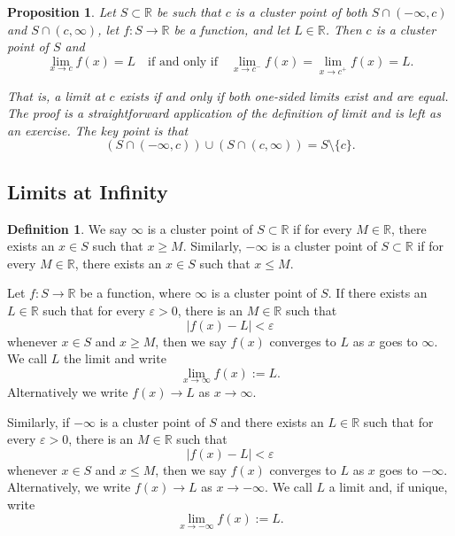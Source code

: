 \documentclass{article}
\newtheorem{prop}[theorem]{Proposition}
\theoremstyle{definition}
\newtheorem{defi}{Definition}[section]
\begin{document}
\begin{prop}
    Let \( S \subset \mathbb{R} \) be such that \( c \) is a cluster point of both \( S \cap (-\infty, c) \) and \( S \cap (c, \infty) \), let \( f: S \rightarrow \mathbb{R} \) be a function, and let \( L \in \mathbb{R} \). Then \( c \) is a cluster point of \( S \) and
    \[ \lim_{x \to c} f(x) = L \quad \text{if and only if} \quad \lim_{x \to c^-} f(x) = \lim_{x \to c^+} f(x) = L. \]
    
    That is, a limit at \( c \) exists if and only if both one-sided limits exist and are equal. The proof is a straightforward application of the definition of limit and is left as an exercise. The key point is that
    \[ (S \cap (-\infty, c)) \cup (S \cap (c, \infty)) = S \setminus \{c\}. \]    
\end{prop}


\subsection{Limits at Infinity}
\begin{defi}
    We say \( \infty \) is a cluster point of \( S \subset \mathbb{R} \) if for every \( M \in \mathbb{R} \), there exists an \( x \in S \) such that \( x \geq M \). Similarly, \( -\infty \) is a cluster point of \( S \subset \mathbb{R} \) if for every \( M \in \mathbb{R} \), there exists an \( x \in S \) such that \( x \leq M \).

Let \( f: S \rightarrow \mathbb{R} \) be a function, where \( \infty \) is a cluster point of \( S \). If there exists an \( L \in \mathbb{R} \) such that for every \( \varepsilon > 0 \), there is an \( M \in \mathbb{R} \) such that
\[
|f(x) - L| < \varepsilon
\]
whenever \( x \in S \) and \( x \geq M \), then we say \( f(x) \) converges to \( L \) as \( x \) goes to \( \infty \). We call \( L \) the limit and write
\[
\lim_{x \rightarrow \infty} f(x) := L.
\]
Alternatively we write \( f(x) \rightarrow L \) as \( x \rightarrow \infty \).

Similarly, if \( -\infty \) is a cluster point of \( S \) and there exists an \( L \in \mathbb{R} \) such that for every \( \varepsilon > 0 \), there is an \( M \in \mathbb{R} \) such that
\[
|f(x) - L| < \varepsilon
\]
whenever \( x \in S \) and \( x \leq M \), then we say \( f(x) \) converges to \( L \) as \( x \) goes to \( -\infty \). Alternatively, we write \( f(x) \rightarrow L \) as \( x \rightarrow -\infty \). We call \( L \) a limit and, if unique, write
\[
\lim_{x \rightarrow -\infty} f(x) := L.
\]
\end{defi}
\end{document}

